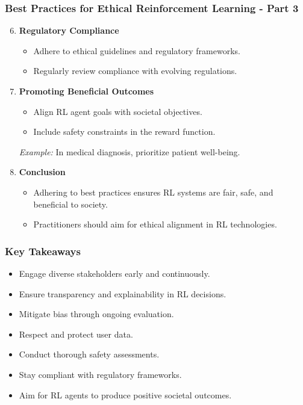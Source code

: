 \documentclass[aspectratio=169]{beamer}
\begin{document}
\begin{frame}[fragile]
    \frametitle{Best Practices for Ethical Reinforcement Learning - Part 3}
    \begin{enumerate}
        \setcounter{enumi}{5} %
        \item \textbf{Regulatory Compliance}
            \begin{itemize}
                \item Adhere to ethical guidelines and regulatory frameworks.
                \item Regularly review compliance with evolving regulations.
            \end{itemize}

        \item \textbf{Promoting Beneficial Outcomes}
            \begin{itemize}
                \item Align RL agent goals with societal objectives.
                \item Include safety constraints in the reward function.
            \end{itemize}
            \textit{Example:} In medical diagnosis, prioritize patient well-being.

        \item \textbf{Conclusion}
            \begin{itemize}
                \item Adhering to best practices ensures RL systems are fair, safe, and beneficial to society.
                \item Practitioners should aim for ethical alignment in RL technologies.
            \end{itemize}
    \end{enumerate}
\end{frame}

\begin{frame}[fragile]
    \frametitle{Key Takeaways}
    \begin{itemize}
        \item Engage diverse stakeholders early and continuously.
        \item Ensure transparency and explainability in RL decisions.
        \item Mitigate bias through ongoing evaluation.
        \item Respect and protect user data.
        \item Conduct thorough safety assessments.
        \item Stay compliant with regulatory frameworks.
        \item Aim for RL agents to produce positive societal outcomes.
    \end{itemize}
\end{frame}
\end{document}
